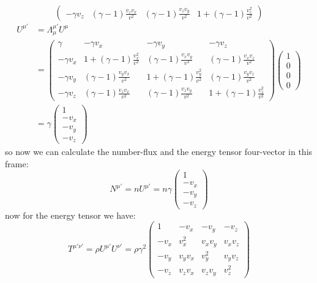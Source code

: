 \documentclass[11pt, a4paper]{report}
\begin{document}
\begin{itemize}
\begin{equation}
\begin{pmatrix}
        -\gamma v_z & (\gamma-1)\frac{v_z v_x}{v^2} & (\gamma-1)\frac{v_z v_y}{v^2} & 1+(\gamma-1)\frac{v_z^2}{v^2}
        \end{pmatrix}
    \end{equation}
    \begin{align*}
        U^{\mu'} &=\Lambda^{\mu'}_\mu U^\mu \\
        &=
         \begin{pmatrix}
        \gamma & -\gamma v_x & -\gamma v_y & -\gamma v_z \\
        -\gamma v_x & 1+(\gamma-1)\frac{v_x^2}{v^2} & (\gamma-1)\frac{v_x v_y}{v^2} & (\gamma-1)\frac{v_x v_z}{v^2} \\
        -\gamma v_y & (\gamma-1)\frac{v_y v_x}{v^2} & 1+(\gamma-1)\frac{v_y^2}{v^2} & (\gamma-1)\frac{v_y v_z}{v^2} \\
        -\gamma v_z & (\gamma-1)\frac{v_z v_x}{v^2} & (\gamma-1)\frac{v_z v_y}{v^2} & 1+(\gamma-1)\frac{v_z^2}{v^2}
        \end{pmatrix}
        \begin{pmatrix}
            1 \\
            0\\
            0 \\
            0
        \end{pmatrix} \\
        &= \gamma
        \begin{pmatrix}
            1 \\
            -v_x \\
            -v_y \\
            -v_z
        \end{pmatrix}
    \end{align*}
    so now we can calculate the number-flux and the energy tensor four-vector in this frame:
    \begin{equation}
    N^{\mu'} = n U^{\mu'} = n \gamma 
    \begin{pmatrix}
        1 \\
        -v_x \\
        -v_y \\
        -v_z
    \end{pmatrix}
    \end{equation}
    now for the energy tensor we have:
    \begin{equation}
    T^{\mu'\nu'} = \rho U^{\mu'} U^{\nu'} = \rho \gamma^2
    \begin{pmatrix}
        1 & -v_x & -v_y & -v_z \\
        -v_x & v_x^2 & v_x v_y & v_x v_z \\
        -v_y & v_y v_x & v_y^2 & v_y v_z \\
        -v_z & v_z v_x & v_z v_y & v_z^2
    \end{pmatrix}
    \end{equation}


\end{itemize}
\end{document}
